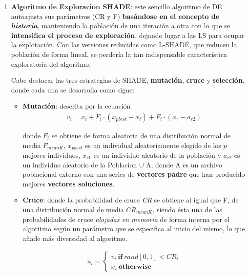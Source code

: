 \begin{enumerate}
	\item  \label{algSHADEILS:1} \textbf{Algoritmo de Exploracion SHADE}: este sencillo algoritmo de DE autoajusta sus parámetros (CR y F) \textbf{basándose en el concepto de \textit{historia}}\cite{SHADE}, manteniendo la población de una iteración a otra con lo que se \textbf{intensifica el proceso de exploración}, dejando lugar a las LS para ocupar la explotación. Con las versiones reducidas como L-SHADE, que reducen la población de forma lineal, se perdería la tan indispensable característica exploratoria del algoritmo.
	
	Cabe destacar las tres estrategias de SHADE, \textbf{mutación}, \textbf{cruce} y \textbf{selección}, donde cada una se desarrolla como sigue:
	\begin{itemize}
		\item \textbf{Mutación}: descrita por la ecuación
		\begin{equation}\label{eq:MutationSH}
			\begin{gathered}
				v_i = x_i + F_i \cdot (x_{pbest} - x_i) + F_i \cdot (x_r - a_{r2})
			\end{gathered}
		\end{equation}
		 
		 donde $F_i$ se obtiene de forma aleatoria de una distribución normal de media $F_{meanK}$, $x_{pbest}$ es un individual aleatoriamente elegido de los $p$ mejores individuos, $x_{r1}$ es un individuo aleatorio de la población y $a_{r2}$ es un individuo aleatorio de la Poblacion $\cup$ A, donde A es un archivo poblacional externo con una series de \textbf{vectores padre} que han producido mejores \textbf{vectores soluciones}.
			
		\item \textbf{Cruce}: donde la probabilidad de cruce \textit{CR} se obtiene al igual que F, de una distribución normal de media $CR_{meanK}$, siendo ésta una de las probabilidades de cruce \textit{alojadas en memoria} de forma interna por el algoritmo según un parámetro que se especifica al inicio del mismo, lo que añade más diversidad al algoritmo.
		
		\begin{equation}\label{eq:CrossoverSH}
			\begin{gathered}
				u_i= \begin{cases}
					v_i \ \textbf{if} \ rand[0,1] < CR_i \\
					x_i \ \textbf{otherwise}
				\end{cases}
			\end{gathered}
		\end{equation}
		

\end{itemize}
\end{enumerate}
